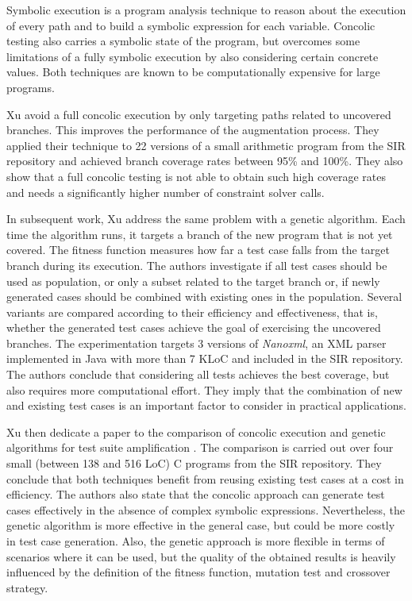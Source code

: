 Symbolic execution is a program analysis technique to reason about the execution of every path and to build a symbolic expression for each variable. 
Concolic testing also carries a symbolic state of the program, but overcomes some limitations of a fully symbolic execution by also considering certain concrete values. 
Both techniques are known to be computationally expensive for large programs.

Xu \etal avoid a full concolic execution by only targeting paths related to uncovered branches. 
This improves the performance of the augmentation process.
They applied their technique to 22 versions of a small arithmetic program from the SIR \cite{SIR} repository and achieved branch coverage rates between 95\% and 100\%. 
They also show that a full concolic testing is not able to obtain such high coverage rates and needs a significantly higher number of constraint solver calls.

In subsequent work, Xu \etal\cite{xu2010factors} address the same problem with a genetic algorithm. 
Each time the algorithm runs, it targets a branch of the new program that is not yet covered.
The fitness function measures how far a test case falls from the target branch during its execution. 
The authors investigate if all test cases should be used as population, or only a subset related to the target branch or, if newly generated cases should be combined with existing ones in the population. 
Several variants are compared according to their efficiency and effectiveness, that is, whether the generated test cases achieve the goal of exercising the uncovered branches.
The experimentation targets 3 versions of \emph{Nanoxml}, an XML parser implemented in Java with more than 7 KLoC and included in the SIR \cite{SIR} repository.
The authors conclude that considering all tests achieves the best coverage, but also requires more computational effort. 
They imply that the combination of new and existing test cases is an important factor to consider in practical applications. 

Xu \etal then dedicate a paper to the comparison of concolic execution and genetic algorithms for test suite amplification \cite{xu2010directed}. 
The comparison is carried out over four small (between 138 and 516 LoC) C programs from the SIR \cite{SIR} repository.
They conclude that both techniques benefit from reusing existing test cases at a cost in efficiency. 
The authors also state that the concolic approach can generate test cases  effectively in the absence of complex symbolic expressions. 
Nevertheless, the genetic algorithm is more effective in the general case, but could be more costly in test case generation. 
Also, the genetic approach is more flexible in terms of scenarios where it can be used, but the quality of the obtained results is heavily influenced by the definition of the fitness function, mutation test and crossover strategy. 

